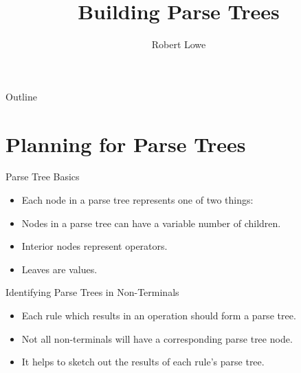 \documentclass[handout]{beamer}
\title{Building Parse Trees}
\author{Robert Lowe}
\institute[Southeast Missouri State University] %
{
  Department of Computer Science\\
  Southeast Missouri State University
}
\date[]{}
\begin{document}
\begin{frame}
  \titlepage
\end{frame}

\begin{frame}{Outline}
  \tableofcontents
\end{frame}





\section{Planning for Parse Trees}
\begin{frame}{Parse Tree Basics}
    \begin{itemize}
        \item Each node in a parse tree represents one of two things:
        \item Nodes in a parse tree can have a variable number of children.
        \item Interior nodes represent operators.
        \item Leaves are values.
    \end{itemize}
\end{frame}


\begin{frame}{Identifying Parse Trees in Non-Terminals}
    \begin{itemize}
        \item Each rule which results in an operation should form a parse tree.
        \item Not all non-terminals will have a corresponding parse tree node.
        \item It helps to sketch out the results of each rule's parse tree.
    \end{itemize} 
\end{frame}
\end{document}
